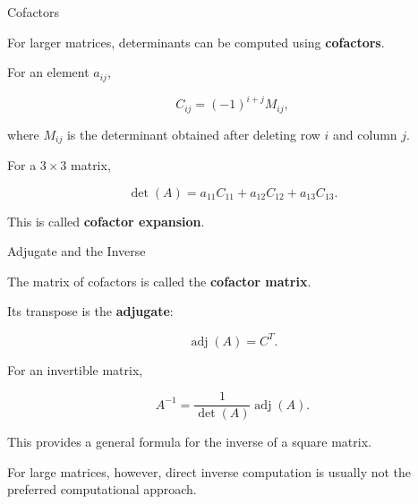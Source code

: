 \begin{frame}{Cofactors}

For larger matrices, determinants can be computed using
\textbf{cofactors}.

For an element $a_{ij}$,

\[
\boxed{
C_{ij}=(-1)^{i+j}M_{ij},
}
\]

where $M_{ij}$ is the determinant obtained after deleting
row $i$ and column $j$.

\vspace{0.4cm}

For a $3\times3$ matrix,

\[
\det(A)
=
a_{11}C_{11}
+
a_{12}C_{12}
+
a_{13}C_{13}.
\]

\vspace{0.3cm}

This is called \textbf{cofactor expansion}.

\end{frame}



\begin{frame}{Adjugate and the Inverse}

The matrix of cofactors is called the \textbf{cofactor matrix}.

Its transpose is the \textbf{adjugate}:

\[
\operatorname{adj}(A)
=
C^T.
\]

For an invertible matrix,

\[
\boxed{
A^{-1}
=
\frac{1}{\det(A)}
\operatorname{adj}(A).
}
\]

\vspace{0.4cm}

This provides a general formula for the inverse of a
square matrix.

\vspace{0.3cm}

For large matrices, however, direct inverse computation is
usually not the preferred computational approach.

\end{frame}



